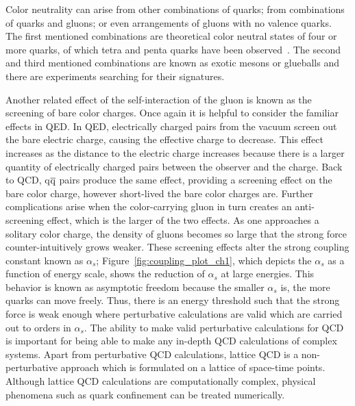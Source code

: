 Color neutrality can arise from other combinations of quarks; from combinations of quarks and gluons; or even arrangements of gluons with no valence quarks. The first mentioned combinations are theoretical color neutral states of four or more quarks, of which tetra and penta quarks have been observed~\cite{Aaij:2015tga}. The second and third mentioned combinations are known as exotic mesons or glueballs and there are experiments searching for their signatures.

Another related effect of the self-interaction of the gluon is known as the screening of bare color charges. Once again it is helpful to consider the familiar effects in QED. In QED, electrically charged pairs from the vacuum screen out the bare electric charge, causing the effective charge to decrease. This effect increases as the distance to the electric charge increases because there is a larger quantity of electrically charged pairs between the observer and the charge. Back to QCD, q$\overline{\rm q}$ pairs produce the same effect, providing a screening effect on the bare color charge, however short-lived the bare color charges are. Further complications arise when the color-carrying gluon in turn creates an anti-screening effect, which is the larger of the two effects. As one approaches a solitary color charge, the density of gluons becomes so large that the strong force counter-intuitively grows weaker. These screening effects alter the strong coupling constant known as $\alpha_s$; Figure~\ref{fig:coupling_plot_ch1}, which depicts the $\alpha_s$ as a function of energy scale, shows the reduction of $\alpha_s$ at large energies. This behavior is known as asymptotic freedom because the smaller $\alpha_s$ is, the more quarks can move freely. Thus, there is an energy threshold such that the strong force is weak enough where perturbative calculations are valid which are carried out to orders in $\alpha_s$. The ability to make valid perturbative calculations for QCD is important for being able to make any in-depth QCD calculations of complex systems. Apart from perturbative QCD calculations, lattice QCD is a non-perturbative approach which is formulated on a lattice of space-time points. Although lattice QCD calculations are computationally complex, physical phenomena such as quark confinement can be treated numerically.

